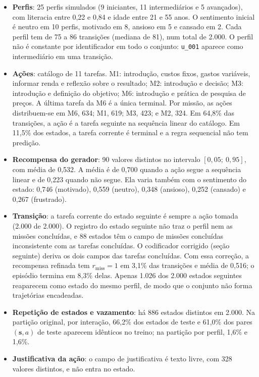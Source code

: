 \begin{itemize}
    \item \textbf{Perfis}: 25 perfis simulados (9 iniciantes, 11 intermediários e 5 avançados), com literacia entre 0,22 e 0,84 e idade entre 21 e 55 anos. O sentimento inicial é neutro em 10 perfis, motivado em 8, ansioso em 5 e cansado em 2. Cada perfil tem de 75 a 86 transições (mediana de 81), num total de 2.000. O perfil não é constante por identificador em todo o conjunto: \texttt{u\_001} aparece como intermediário em uma transição.
    \item \textbf{Ações}: catálogo de 11 tarefas. M1: introdução, custos fixos, gastos variáveis, informar renda e reflexão sobre o resultado; M2: introdução e decisão; M3: introdução e definição do objetivo; M6: introdução e prática de pesquisa de preços. A última tarefa da M6 é a única terminal. Por missão, as ações distribuem-se em M6, 634; M1, 619; M3, 423; e M2, 324. Em 64,8\% das transições, a ação é a tarefa seguinte na sequência linear do catálogo. Em 11,5\% dos estados, a tarefa corrente é terminal e a regra sequencial não tem predição.
    \item \textbf{Recompensa do gerador}: 90 valores distintos no intervalo $[0{,}05;\ 0{,}95]$, com média de 0,532. A média é de 0,700 quando a ação segue a sequência linear e de 0,223 quando não segue. Ela varia também com o sentimento do estado: 0,746 (motivado), 0,559 (neutro), 0,348 (ansioso), 0,252 (cansado) e 0,267 (frustrado).
    \item \textbf{Transição}: a tarefa corrente do estado seguinte é sempre a ação tomada (2.000 de 2.000). O registro do estado seguinte não traz o perfil nem as missões concluídas, e 88 estados têm o campo de missões concluídas inconsistente com as tarefas concluídas. O codificador corrigido (seção seguinte) deriva os dois campos das tarefas concluídas. Com essa correção, a recompensa refinada tem $r_{\text{miss}} = 1$ em 3,1\% das transições e média de 0,516; o episódio termina em 8,3\% delas. Apenas 1.026 dos 2.000 estados seguintes reaparecem como estado do mesmo perfil, de modo que o conjunto não forma trajetórias encadeadas.
    \item \textbf{Repetição de estados e vazamento}: há 886 estados distintos em 2.000. Na partição original, por interação, 66,2\% dos estados de teste e 61,0\% dos pares $(\mathbf{s}, a)$ de teste aparecem idênticos no treino; na partição por perfil, 1,6\% e 1,6\%.
    \item \textbf{Justificativa da ação}: o campo de justificativa é texto livre, com 328 valores distintos, e não entra no estado.
\end{itemize}

